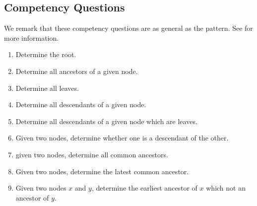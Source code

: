 \subsection{Competency Questions}
\label{cqs:Tree}
We remark that these competency questions are as general as the pattern. See \cite{tree} for more information.
\begin{enumerate}[CQ1.]
\item Determine the root.
\item Determine all ancestors of a given node.
\item Determine all leaves.
\item Determine all descendants of a given node.
\item Determine all descendants of a given node which are leaves.
\item Given two nodes, determine whether one is a descendant of the other.
\item given two nodes, determine all common ancestors.
\item Given two nodes, determine the latest common ancestor.
\item Given two nodes $x$ and $y$, determine the earliest ancestor of $x$ which not an ancestor of $y$.
\end{enumerate}

\newpage
